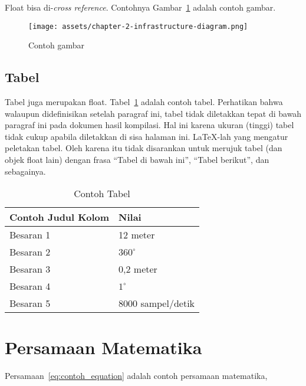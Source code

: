 Float bisa di-\textit{cross reference}. Contohnya Gambar~\ref{fig:contoh_gambar} adalah contoh gambar.

\begin{figure}[h]
	\centering
	\texttt{[image: assets/chapter-2-infrastructure-diagram.png]}
	\caption{Contoh gambar}
	\label{fig:contoh_gambar}
\end{figure}

\subsection{Tabel}

Tabel juga merupakan float. Tabel~\ref{table:contoh_tabel} adalah contoh tabel. Perhatikan bahwa walaupun didefinisikan setelah paragraf ini, tabel tidak diletakkan tepat di bawah paragraf ini pada dokumen hasil kompilasi. Hal ini karena ukuran (tinggi) tabel tidak cukup apabila diletakkan di sisa halaman ini. \LaTeX-lah yang mengatur peletakan tabel. Oleh karena itu tidak disarankan untuk merujuk tabel (dan objek float lain) dengan frasa ``Tabel di bawah ini'', ``Tabel berikut'', dan sebagainya.

\begin{table}[htbp]
	\centering
	\caption{Contoh Tabel}
	\label{table:contoh_tabel}
	\begin{tabular}{ll}
		\toprule
		\multicolumn{1}{l}{\textbf{Contoh Judul Kolom}} & \multicolumn{1}{l}{\textbf{Nilai}} \\
		\midrule
		Besaran 1                                       & 12 meter                           \\
		Besaran 2                                       & $360^\circ$                        \\
		Besaran 3                                       & 0,2 meter                          \\
		Besaran 4                                       & $1^\circ$                          \\
		Besaran 5                                       & 8000 sampel/detik                  \\
		\bottomrule
	\end{tabular}
\end{table}

\section{Persamaan Matematika}

Persamaan~\eqref{eq:contoh_equation} adalah contoh persamaan matematika,

